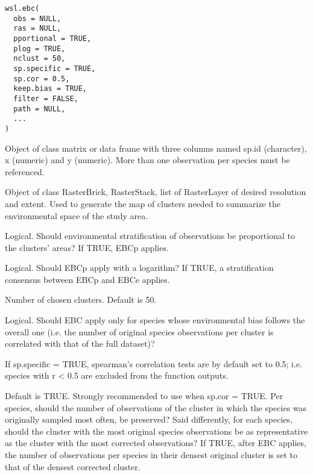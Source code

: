 \documentclass[a4paper]{book}
\begin{document}
%
\begin{Usage}
\begin{verbatim}
wsl.ebc(
  obs = NULL,
  ras = NULL,
  pportional = TRUE,
  plog = TRUE,
  nclust = 50,
  sp.specific = TRUE,
  sp.cor = 0.5,
  keep.bias = TRUE,
  filter = FALSE,
  path = NULL,
  ...
)
\end{verbatim}
\end{Usage}
%
\begin{Arguments}
\begin{ldescription}
\item[\code{obs}] Object of class matrix or data frame with three columns named sp.id (character),
x (numeric) and y (numeric). More than one observation per species must be referenced.

\item[\code{ras}] Object of class RasterBrick, RasterStack, list of RasterLayer of desired resolution
and extent. Used to generate the map of clusters needed to summarize the environmental space of
the study area.

\item[\code{pportional}] Logical. Should environmental stratification of observations be proportional
to the clusters' areas? If TRUE, EBCp applies.

\item[\code{plog}] Logical. Should EBCp apply with a logarithm? If TRUE, a stratification consensus
between EBCp and EBCe applies.

\item[\code{nclust}] Number of chosen clusters. Default is 50.

\item[\code{sp.specific}] Logical. Should EBC apply only for species whose environmental bias follows
the overall one (i.e. the number of original species observations per cluster is correlated
with that of the full dataset)?

\item[\code{sp.cor}] If sp.specific = TRUE, spearman's correlation tests are by default set to 0.5;
i.e. species with r < 0.5 are excluded from the function outputs.

\item[\code{keep.bias}] Default is TRUE. Strongly recommended to use when sp.cor = TRUE. Per species,
should the number of observations of the cluster in which the species was originally sampled
most often, be preserved? Said differently, for each species, should the cluster with the most
original species observations be as representative as the cluster with the most corrected
observations? If TRUE, after EBC applies, the number of observations per species in their
densest original cluster is set to that of the densest corrected cluster.


\end{ldescription}
\end{Arguments}
\end{document}
